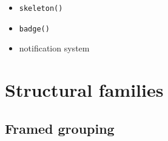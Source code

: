 \begin{itemize}
  \begin{itemize}
  \tightlist
  \item
    \texttt{s\allowbreak{}k\allowbreak{}e\allowbreak{}l\allowbreak{}e\allowbreak{}t\allowbreak{}o\allowbreak{}n\allowbreak{}(\allowbreak{})}
  \item
    \texttt{b\allowbreak{}a\allowbreak{}d\allowbreak{}g\allowbreak{}e\allowbreak{}(\allowbreak{})}
  \item
    notification system
  \end{itemize}
\end{itemize}

\section{Structural families}\label{record-019-structural-families}

\subsection{Framed grouping}\label{record-019-framed-grouping}

